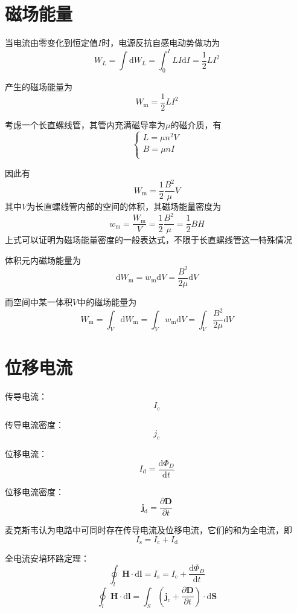 \documentclass[12pt, a4paper, twoside]{ctexbook}
\begin{document}
\section{磁场能量}
当电流由零变化到恒定值$I$时，电源反抗自感电动势做功为
$$
W_L=\int\mathrm{d}W_L=\int_{0}^{I}LI\mathrm{d}I=\frac{1}{2}LI^2
$$

产生的磁场能量为
$$
W_\mathrm{m}=\frac{1}{2}LI^2
$$

考虑一个长直螺线管，其管内充满磁导率为$\mu$的磁介质，有
$$
\left\{ \begin{array}{l}
	L=\mu n^2V\\
	B=\mu nI\\
\end{array} \right. 
$$

因此有
$$
W_\mathrm{m}=\frac{1}{2}\frac{B^2}{\mu}V
$$
其中$V$为长直螺线管内部的空间的体积，其磁场能量密度为
$$
w_\mathrm{m}=\frac{W_\mathrm{m}}{V}=\frac{1}{2}\frac{B^2}{\mu}=\frac{1}{2}BH
$$
上式可以证明为磁场能量密度的一般表达式，不限于长直螺线管这一特殊情况

体积元内磁场能量为
$$
\mathrm{d}W_\mathrm{m}=w_\mathrm{m}\mathrm{d}V=\frac{B^2}{2\mu}\mathrm{d}V
$$

而空间中某一体积$V$中的磁场能量为
$$
W_\mathrm{m}=\int_V \mathrm{d}W_\mathrm{m}=\int_V w_\mathrm{m}\mathrm{d}V=\int_V \frac{B^2}{2\mu}\mathrm{d}V
$$
\section{位移电流}
{\sonti 传导电流}：
$$
I_\mathrm{c}
$$

{\sonti 传导电流密度}：
$$
j_\mathrm{c}
$$

{\sonti 位移电流}：
$$
I_\mathrm{d}=\frac{\mathrm{d}\varPhi_D}{\mathrm{d}t}
$$

{\sonti 位移电流密度}：
$$
\boldsymbol{j}_\mathrm{d}=\frac{\partial \boldsymbol{D}}{\partial t}
$$

麦克斯韦认为电路中可同时存在传导电流及位移电流，它们的和为全电流，即
$$
I_\mathrm{s}=I_\mathrm{c}+I_\mathrm{d}
$$

{\sonti 全电流安培环路定理}：
$$
\oint_l \boldsymbol{H}\cdot\mathrm{d}\boldsymbol{l}=I_\mathrm{s}=I_\mathrm{c}+\frac{\mathrm{d}\varPhi_D}{\mathrm{d}t}
$$
$$
\oint_l \boldsymbol{H}\cdot\mathrm{d}\boldsymbol{l}=\int_S\left(\boldsymbol{j}_\mathrm{c}+\frac{\partial \boldsymbol{D}}{\partial t}\right)\cdot\mathrm{d}\boldsymbol{S}
$$
\end{document}
